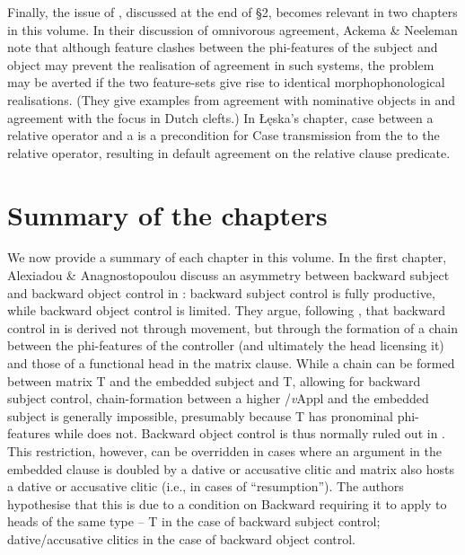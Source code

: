 \documentclass[output=paper]{langsci/langscibook}
\begin{document}
Finally, the issue of , discussed at the end of §2, becomes relevant in two chapters in this volume. In their discussion of omnivorous agreement, Ackema \& Neeleman note that although feature clashes between the phi-features of the subject and object may prevent the realisation of agreement in such systems, the problem may be averted if the two feature-sets give rise to identical morphophonological realisations. (They give examples from agreement with nominative objects in  and agreement with the focus in Dutch clefts.) In Łęska’s chapter, case  between a relative operator and a   is a precondition for Case transmission from the  to the relative operator, resulting in default agreement on the relative clause predicate.

\section{Summary of the chapters}

We now provide a summary of each chapter in this volume. In the first chapter, Alexiadou \& Anagnostopoulou discuss an asymmetry between backward subject and backward object control in : backward subject control is fully productive, while backward object control is limited. They argue, following \citet{Tsakali2017}, that backward control in  is derived not through movement, but through the formation of a chain between the phi-features of the controller (and ultimately the head licensing it) and those of a functional head in the matrix clause. While a chain can be formed between matrix T and the embedded subject and T, allowing for backward subject control, chain-formation between a higher /\textit{v}Appl and the embedded subject is generally impossible, presumably because T has pronominal phi-features while  does not. Backward object control is thus normally ruled out in . This restriction, however, can be overridden in cases where an  argument in the embedded clause is doubled by a dative or accusative clitic and matrix  also hosts a dative or accusative clitic (i.e., in cases of ``resumption''). The authors hypothesise that this is due to a condition on Backward  requiring it to apply to heads of the same type – T in the case of backward subject control; dative\slash accusative clitics in the case of backward object control.
\end{document}
